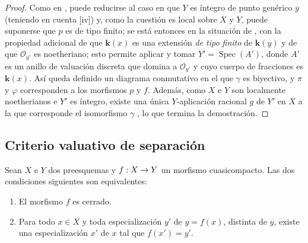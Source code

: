 \documentclass[oneside,10pt]{amsart}
\makeatletter
\newcommand{\ega@arrow}[2]{\mathchoice{#1}{#2}{#2}{#2}}
\renewcommand{\to}{\ega@arrow{\longrightarrow}{\rightarrow}}
\let\EGAOriginalLabel\label
\renewcommand{\label}[1]{\phantomsection\EGAOriginalLabel{#1}}
\makeatother
\begin{document}
\begin{proof}
Como en , puede reducirse al caso en que $Y$ es íntegro de punto genérico $y$ (teniendo en cuenta [iv]) y, como la cuestión es local sobre $X$ y $Y$, puede suponerse que $p$ es de tipo finito;
se está entonces en la situación de , con la propiedad adicional de que $\boldsymbol{k}(x)$ es una extensión \emph{de tipo finito} de $\boldsymbol{k}(y)$  y de que $\mathcal{O}_{y'}$ es noetheriano;
esto permite aplicar  y tomar $Y'=\operatorname{Spec}(A')$, donde $A'$ es un anillo de valuación discreta que domina a $\mathcal{O}_{y'}$ y cuyo cuerpo de fracciones es $\boldsymbol{k}(x)$.
Así queda definido un diagrama conmutativo  en el que $\gamma$ es biyectivo, y $\pi$ y $\varphi$ corresponden a los morfismos $p$ y $f$.
Además, como $X$ e $Y$ son localmente noetherianos  e $Y'$ es íntegro, existe una única $Y$-aplicación racional $g$ de $Y'$ en $X$ a la que corresponde el isomorfismo $\gamma$ , lo que termina la demostración.
\end{proof}


\subsection{Criterio valuativo de separación}
\label{subsection:II.7.2-fr}

\begin{proposition}[7.2.1]
\label{II.7.2.1-fr}
Sean $X$ e $Y$ dos preesquemas y $f:X\to Y$ un morfismo cuasicompacto.
Las dos condiciones siguientes son equivalentes:
\begin{enumerate}
  \item[\rm{(a)}] El morfismo $f$ es cerrado.
  \item[\rm{(b)}] Para todo $x\in X$ y toda especialización $y'$ de $y=f(x)$, distinta de $y$, existe una especialización $x'$ de $x$ tal que $f(x')=y'$.
\end{enumerate}
\end{proposition}
\end{document}
